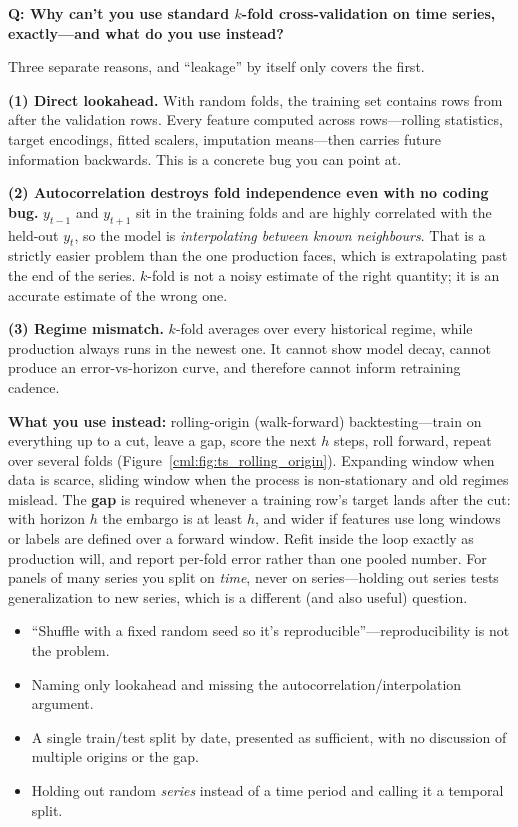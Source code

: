 \begin{interviewq}
\textbf{Q: Why can't you use standard $k$-fold cross-validation on time series, exactly---and what do you use instead?}

 \quad {} \quad \badgefreq{\freqhigh}

\stronganswer

Three separate reasons, and ``leakage'' by itself only covers the first.

\textbf{(1) Direct lookahead.} With random folds, the training set contains rows from after the validation rows. Every feature computed across rows---rolling statistics, target encodings, fitted scalers, imputation means---then carries future information backwards. This is a concrete bug you can point at.

\textbf{(2) Autocorrelation destroys fold independence even with no coding bug.} $y_{t-1}$ and $y_{t+1}$ sit in the training folds and are highly correlated with the held-out $y_t$, so the model is \emph{interpolating between known neighbours}. That is a strictly easier problem than the one production faces, which is extrapolating past the end of the series. $k$-fold is not a noisy estimate of the right quantity; it is an accurate estimate of the wrong one.

\textbf{(3) Regime mismatch.} $k$-fold averages over every historical regime, while production always runs in the newest one. It cannot show model decay, cannot produce an error-vs-horizon curve, and therefore cannot inform retraining cadence.

\textbf{What you use instead:} rolling-origin (walk-forward) backtesting---train on everything up to a cut, leave a gap, score the next $h$ steps, roll forward, repeat over several folds (Figure~\ref{cml:fig:ts_rolling_origin}). Expanding window when data is scarce, sliding window when the process is non-stationary and old regimes mislead. The \textbf{gap} is required whenever a training row's target lands after the cut: with horizon $h$ the embargo is at least $h$, and wider if features use long windows or labels are defined over a forward window. Refit inside the loop exactly as production will, and report per-fold error rather than one pooled number. For panels of many series you split on \emph{time}, never on series---holding out series tests generalization to new series, which is a different (and also useful) question.

\redflags
\begin{itemize}
    \item ``Shuffle with a fixed random seed so it's reproducible''---reproducibility is not the problem.
    \item Naming only lookahead and missing the autocorrelation/interpolation argument.
    \item A single train/test split by date, presented as sufficient, with no discussion of multiple origins or the gap.
    \item Holding out random \emph{series} instead of a time period and calling it a temporal split.
\end{itemize}


\end{interviewq}
